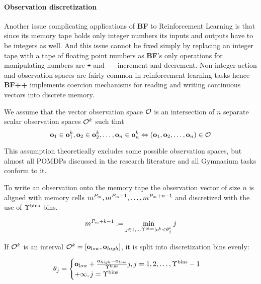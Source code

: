 \paragraph{Observation discretization}
\label{sec:observe}

Another issue complicating applications of \textbf{BF} to Reinforcement Learning is that since its memory tape holds only integer numbers its inputs and outputs have to be integers as well.
And this issue cannot be fixed simply by replacing an integer tape with a tape of floating point numbers as \textbf{BF}'s only operations for manipulating numbers are \texttt{+} and \texttt{-} - increment and decrement.
Non-integer action and observation spaces are fairly common in reinforcement learning tasks hence \textbf{BF++} implements coercion mechanisms for reading and writing continuous vectors into discrete memory.

We assume that the vector observation space $\mathcal{O}$ is an intersection of $n$ separate scalar observation spaces $\mathcal{O}^k$ such that 
\begin{equation}
 \mathbf{o}_1 \in \mathbf{o}_1^k,\mathbf{o}_2 \in \mathbf{o}_2^k,\dots,\mathbf{o}_n \in \mathbf{o}_n^k \Leftrightarrow (\mathbf{o}_1,\mathbf{o}_2,\dots,\mathbf{o}_n) \in \mathcal{O}  
\end{equation}

This assumption theoretically excludes some possible observation spaces, but almost all POMDPs discussed in the research literature and all Gymnasium tasks conform to it.

To write an observation onto the memory tape the observation vector of size $n$ is aligned with memory cells $m^{P_m},m^{P_m+1},\dots,m^{P_m+n-1}$ and discretized with the use of $\Upsilon^\text{bins}$ bins.

\begin{equation}
\label{eq:discretization}
m^{P_m+k-1} := \min_{j \in 1,\dots \Upsilon^\text{bins} | o^k < \theta^k_j} j
\end{equation}

If $\mathcal{O}^k$ is an interval $\mathcal{O}^k=[\mathbf{o}_{low}, \mathbf{o}_{high}]$, it is split into discretization bins evenly:

\begin{equation}
\label{eq:static-thresholds}
\theta_j = \begin{cases}
\mathbf{o}_{low}+\frac{\mathbf{o}_{high}-\mathbf{o}_{low}}{\Upsilon^\text{bins}}j, j=1,2,\dots,\Upsilon^\text{bins}-1 \\
+\infty, j=\Upsilon^\text{bins} 
\end{cases}
\end{equation}

